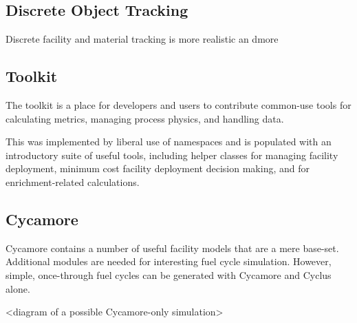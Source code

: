 \subsection{Discrete Object Tracking}

Discrete facility and material tracking is more realistic an dmore 

\subsection{Toolkit}

The toolkit is a place for developers and users to contribute common-use tools 
for calculating metrics, managing process physics, and handling data.

This was implemented by liberal use of namespaces and is populated with an
introductory suite of useful tools, including helper classes for managing
facility deployment, minimum cost facility deployment decision making, and for
enrichment-related calculations.

\subsection{Cycamore}

Cycamore contains a number of useful facility models that are a mere base-set.
Additional modules are needed for interesting fuel cycle simulation. However,
simple, once-through fuel cycles can be generated with Cycamore and Cyclus alone.

<diagram of a possible Cycamore-only simulation>
